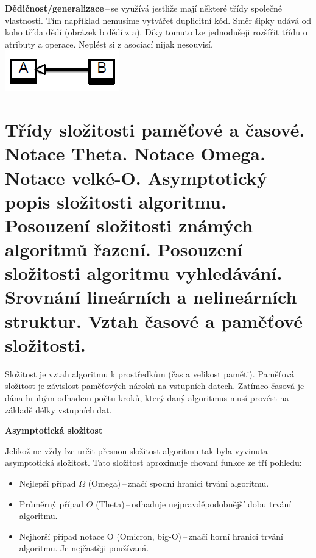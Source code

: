 \textbf{Dědičnost/generalizace}\,--\,se využívá jestliže mají některé třídy společné vlastnosti. Tím například nemusíme vytvářet duplicitní kód. Směr šipky udává od koho třída dědí (obrázek b dědí z a). Díky tomuto lze jednodušeji rozšířit třídu o atributy a operace. Neplést si z asociací nijak nesouvisí.\\
\includegraphics[scale=1]{BPC-TIN/images/dedicnost.PNG}






\newpage
\section{Třídy složitosti paměťové a časové. Notace Theta. Notace Omega. Notace velké-O. Asymptotický popis složitosti algoritmu. Posouzení složitosti známých algoritmů řazení. Posouzení složitosti algoritmu vyhledávání. Srovnání lineárních a nelineárních struktur. Vztah časové a paměťové složitosti.}

Složitost je vztah algoritmu k prostředkům (čas a velikost paměti). Paměťová složitost je závislost paměťových nároků na vstupních datech. Zatímco časová je dána hrubým odhadem počtu kroků, který daný algoritmus musí provést na základě délky vstupních dat.

\begin{Large}\vspace{0,5cm} \textbf{Asymptotická složitost}
\end{Large}

Jelikož ne vždy lze určit přesnou složitost algoritmu tak byla vyvinuta asymptotická složitost. Tato složitost aproximuje chovaní funkce ze tří pohledu:
\begin{itemize}
    \item Nejlepší případ $\Omega$ (Omega)\,--\,značí spodní hranici trvání algoritmu.
    \item Průměrný případ $\Theta$ (Theta)\,--\,odhaduje nejpravděpodobnější dobu trvání algoritmu.
    \item Nejhorší případ notace O (Omicron, big-O)\,--\,značí horní hranici trvání algoritmu. Je nejčastěji používaná.
\end{itemize}

